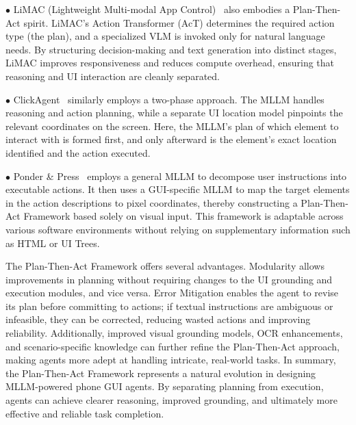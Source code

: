 \noindent$\bullet$ LiMAC (Lightweight Multi-modal App Control)~\cite{christianos2024lightweight} also embodies a Plan-Then-Act spirit. LiMAC’s Action Transformer (AcT) determines the required action type (the plan), and a specialized VLM is invoked only for natural language needs. By structuring decision-making and text generation into distinct stages, LiMAC improves responsiveness and reduces compute overhead, ensuring that reasoning and UI interaction are cleanly separated.

\noindent$\bullet$ ClickAgent~\cite{hoscilowicz2024clickagent} similarly employs a two-phase approach. The MLLM handles reasoning and action planning, while a separate UI location model pinpoints the relevant coordinates on the screen. Here, the MLLM’s plan of which element to interact with is formed first, and only afterward is the element's exact location identified and the action executed.

\noindent$\bullet$ Ponder \& Press~\cite{wang2024ponder} employs a general MLLM to decompose user instructions into executable actions. It then uses a GUI-specific MLLM to map the target elements in the action descriptions to pixel coordinates, thereby constructing a Plan-Then-Act Framework based solely on visual input. This framework is adaptable across various software environments without relying on supplementary information such as HTML or UI Trees.


The Plan-Then-Act Framework offers several advantages. Modularity allows improvements in planning without requiring changes to the UI grounding and execution modules, and vice versa. Error Mitigation enables the agent to revise its plan before committing to actions; if textual instructions are ambiguous or infeasible, they can be corrected, reducing wasted actions and improving reliability. Additionally, improved visual grounding models, OCR enhancements, and scenario-specific knowledge can further refine the Plan-Then-Act approach, making agents more adept at handling intricate, real-world tasks.
In summary, the Plan-Then-Act Framework represents a natural evolution in designing MLLM-powered phone GUI agents. By separating planning from execution, agents can achieve clearer reasoning, improved grounding, and ultimately more effective and reliable task completion.